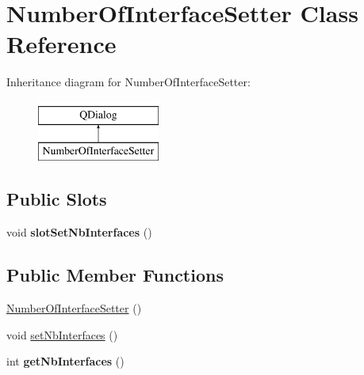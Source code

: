 \hypertarget{class_number_of_interface_setter}{\section{Number\-Of\-Interface\-Setter Class Reference}
\label{class_number_of_interface_setter}
}
Inheritance diagram for Number\-Of\-Interface\-Setter\-:\begin{figure}[H]
\begin{center}
\leavevmode
\includegraphics[height=2.000000cm]{class_number_of_interface_setter}
\end{center}
\end{figure}
\subsection*{Public Slots}
\begin{DoxyCompactItemize}
\item 
\hypertarget{class_number_of_interface_setter_a1db66d6a2ce90a56b779744415729638}{void {\bfseries slot\-Set\-Nb\-Interfaces} ()}\label{class_number_of_interface_setter_a1db66d6a2ce90a56b779744415729638}

\end{DoxyCompactItemize}
\subsection*{Public Member Functions}
\begin{DoxyCompactItemize}
\item 
\hyperlink{class_number_of_interface_setter_ae80973964725a1e7775e3db30eff6076}{Number\-Of\-Interface\-Setter} ()
\item 
void \hyperlink{class_number_of_interface_setter_a8c0b4ec4cb7a0c2e3e1272110c8f7459}{set\-Nb\-Interfaces} ()
\item 
\hypertarget{class_number_of_interface_setter_a896ae3a879b3020b98fa3a72d2a6e9d5}{int {\bfseries get\-Nb\-Interfaces} ()}\label{class_number_of_interface_setter_a896ae3a879b3020b98fa3a72d2a6e9d5}

\end{DoxyCompactItemize}


